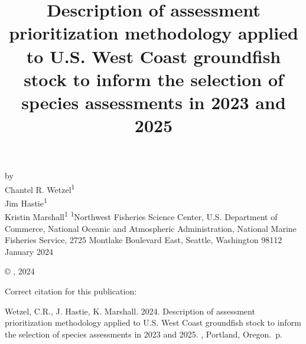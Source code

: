 \documentclass[11pt,
  english,
  a4paper,
]{article}
\date{}
\newcommand{\trTitle}{Description of assessment prioritization methodology applied to U.S. West Coast groundfish stock to inform the selection of species assessments in 2023 and 2025}
\newcommand{\trYear}{2024}
\newcommand{\trMonth}{January}
\newcommand{\trAuthsBack}{Wetzel, C.R., J. Hastie, K. Marshall}
\newcommand{\trCitation}{
\begin{hangparas}{1em}{1}
\trAuthsBack{}. \trYear{}. \trTitle{}. \glsentrylong{pfmc}, Portland, Oregon. \pageref{LastPage}{}\,p.
\end{hangparas}}
\begin{document}

\renewcommand*{\thefootnote}{\fnsymbol{footnote}}

\small
\thispagestyle{empty}
\noindent
\begin{center}
\title{Description of assessment prioritization methodology applied to U.S. West Coast groundfish stock to inform the selection of species assessments in 2023 and 2025}
\vspace{1.5cm}
{\Large\textbf{}}
\vfill
by\\
Chantel R. Wetzel\textsuperscript{1}\\
Jim Hastie\textsuperscript{1}\\
Kristin Marshall\textsuperscript{1}\vfill
\textsuperscript{1}Northwest Fisheries Science Center, U.S. Department of Commerce, National Oceanic and Atmospheric Administration, National Marine Fisheries Service, 2725 Montlake Boulevard East, Seattle, Washington 98112\vfill
\trMonth{} \trYear{}
\end{center}
\clearpage

\thispagestyle{empty}
\vspace*{\fill}
\begin{center}
\copyright{} , \trYear{}\\
\end{center}
\par
\bigskip
\noindent
Correct citation for this publication:
\bigskip
\par
\trCitation{}
\clearpage


\tableofcontents\clearpage
\label{TRlastRoman}
\clearpage

\newpage
\thispagestyle{empty} %

\pagestyle{plain}  %
\renewcommand*{\thefootnote}{\arabic{footnote}}  %
\setcounter{footnote}{0}  %
\renewcommand{\headrulewidth}{0.5pt}
\renewcommand{\footrulewidth}{0.5pt}
\end{document}
